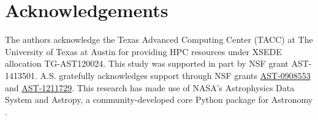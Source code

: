 \section*{Acknowledgements}
The authors acknowledge the Texas Advanced Computing Center (TACC) at The University of Texas at Austin for providing HPC resources under XSEDE allocation TG-AST120024. This study was supported in part by NSF grant AST-1413501. A.S. gratefully acknowledges support through NSF grants \underline{AST-0908553} and  \underline{AST-1211729}. This research has made use of NASA's Astrophysics Data System and Astropy, a community-developed core Python package for Astronomy \citep{Robitailleetal2013}.